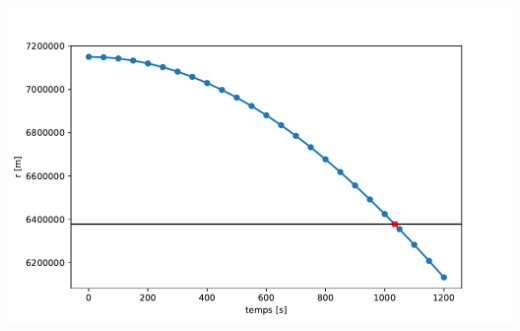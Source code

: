 \documentclass[%
oneside,                 %
final,                   %
10pt,french]{article}
\newenvironment{doconceexercise}{}{}
\begin{document}
\begin{doconceexercise}
\vspace{6mm}

\centerline{\includegraphics[width=1.0\linewidth]{scripts/Ex3RK4.pdf}}

\vspace{6mm}




\end{doconceexercise}



\end{document}
